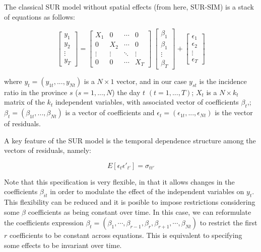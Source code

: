 \documentclass[]{elsarticle} %
\begin{document}
The classical SUR model without spatial effects (from here, SUR-SIM) is
a stack of equations as follows:

\begin{equation}
\label{eq:sur-sim}
\begin{bmatrix}
y_1 \\ y_2 \\ \vdots \\ y_T
\end{bmatrix}
=
  \begin{bmatrix}
X_1 & 0 & \cdots & 0 \\ 0 & X_2 & \cdots & 0 \\ \vdots & \vdots & \ddots & \vdots \\ 0 & 0 & \cdots & X_T
\end{bmatrix}
\
\begin{bmatrix}
\beta_1 \\ \beta_1 \\ \vdots \\ \beta_T
\end{bmatrix}
+
\begin{bmatrix}
\epsilon_1 \\ \epsilon_2 \\ \vdots \\ \epsilon_T
\end{bmatrix}
\end{equation}

\noindent where \(y_{t}=(y_{1t},...,y_{Nt})\) is a \(N \times 1\)
vector, and in our case \(y_{st}\) is the incidence ratio in the
province \(s\) (\(s=1,...,N\)) the day \(t\) \((t=1,...,T)\); \(X_t\) is
a \(N \times k_t\) matrix of the \(k_t\) independent variables, with
associated vector of coefficients \(\beta_t\),;
\(\beta_t=(\beta_{1t},...,\beta_{Nt})\) is a vector of coefficients and
\(\epsilon_t=(\epsilon_{1t},...,\epsilon_{Nt})\) is the vector of
residuals.

A key feature of the SUR model is the temporal dependence structure
among the vectors of residuals, namely:

\begin{equation}
\label{eq:sur-err}
E[\epsilon_t \epsilon'_{t'}]=\sigma_{tt'}
\end{equation}

Note that this specification is very flexible, in that it allows changes
in the coefficients \(\beta_{it}\) in order to modulate the effect of
the independent variables on \(y_t\). This flexibility can be reduced
and it is posible to impose restrictions considering some \(\beta\)
coefficients as being constant over time. In this case, we can
reformulate the coefficients expression
\(\beta_t = (\beta_{1}, \cdots, \beta_{r-1}, \beta_{r}, \beta_{r+1}, \cdots, \beta_{Nt})\)
to restrict the first \(r\) coefficients to be constant across
equations. This is equivalent to specifying some effects to be invariant
over time.
\end{document}
